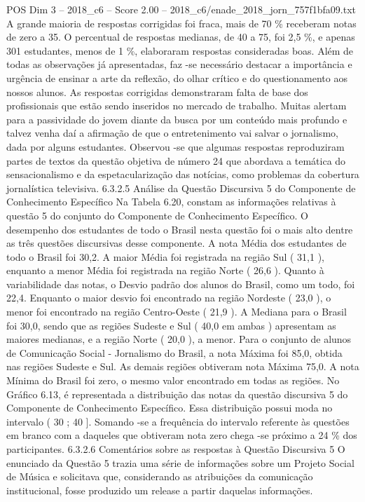 \begin{textsample}{POS Dim 3 – 2018\_c6 – Score 2.00 – 2018\_c6/enade\_2018\_jorn\_757f1bfa09.txt}
A grande maioria de respostas corrigidas foi fraca, mais de 70 \% receberam notas de zero a 35.
O percentual de respostas medianas, de 40 a 75, foi 2,5 \%, e apenas 301 estudantes, menos de 1 \%, elaboraram respostas consideradas boas.
Além de todas as observações já apresentadas, faz -se necessário destacar a importância e urgência de ensinar a arte da reflexão, do olhar crítico e do questionamento aos nossos alunos.
As respostas corrigidas demonstraram falta de base dos profissionais que estão sendo inseridos no mercado de trabalho.
Muitas alertam para a passividade do jovem diante da busca por um conteúdo mais profundo e talvez venha daí a afirmação de que o entretenimento vai salvar o jornalismo, dada por alguns estudantes.
Observou -se que algumas respostas reproduziram partes de textos da questão objetiva de número 24 que abordava a temática do sensacionalismo e da espetacularização das notícias, como problemas da cobertura jornalística televisiva. 6.3.2.5 Análise da Questão Discursiva 5 do Componente de Conhecimento Específico Na Tabela 6.20, constam as informações relativas à questão 5 do conjunto do Componente de Conhecimento Específico.
O desempenho dos estudantes de todo o Brasil nesta questão foi o mais alto dentre as três questões discursivas desse componente.
A nota Média dos estudantes de todo o Brasil foi 30,2.
A maior Média foi registrada na região Sul ( 31,1 ), enquanto a menor Média foi registrada na região Norte ( 26,6 ).
Quanto à variabilidade das notas, o Desvio padrão dos alunos do Brasil, como um todo, foi 22,4.
Enquanto o maior desvio foi encontrado na região Nordeste ( 23,0 ), o menor foi encontrado na região Centro-Oeste ( 21,9 ).
A Mediana para o Brasil foi 30,0, sendo que as regiões Sudeste e Sul ( 40,0 em ambas ) apresentam as maiores medianas, e a região Norte ( 20,0 ), a menor.
Para o conjunto de alunos de Comunicação Social - Jornalismo do Brasil, a nota Máxima foi 85,0, obtida nas regiões Sudeste e Sul.
As demais regiões obtiveram nota Máxima 75,0.
A nota Mínima do Brasil foi zero, o mesmo valor encontrado em todas as regiões.
No Gráfico 6.13, é representada a distribuição das notas da questão discursiva 5 do Componente de Conhecimento Específico.
Essa distribuição possui moda no intervalo ( 30 ; 40 ].
Somando -se a frequência do intervalo referente às questões em branco com a daqueles que obtiveram nota zero chega -se próximo a 24 \% dos participantes. 6.3.2.6 Comentários sobre as respostas à Questão Discursiva 5 O enunciado da Questão 5 trazia uma série de informações sobre um Projeto Social de Música e solicitava que, considerando as atribuições da comunicação institucional, fosse produzido um release a partir daquelas informações.

\end{textsample}
